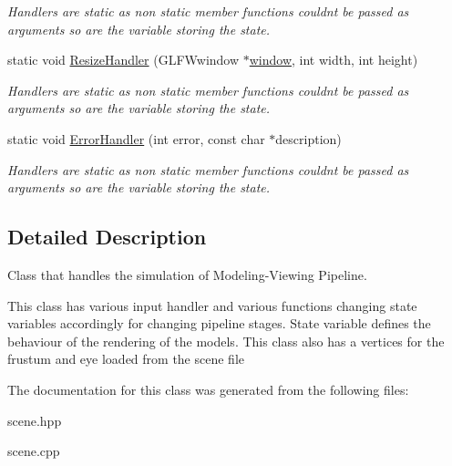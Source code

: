 \begin{DoxyCompactItemize}
\begin{DoxyCompactList}\small\item\em Handlers are static as non static member functions couldn\textquotesingle{}t be passed as arguments so are the variable storing the state. \end{DoxyCompactList}\item 
static void \hyperlink{classcft_1_1Scene_afd4f95d4aa28a930f464f282fdbeb6ac}{Resize\+Handler} (G\+L\+F\+Wwindow $\ast$\hyperlink{classcft_1_1Scene_a5743ac5a5872b962da380e6b8262a347}{window}, int width, int height)\hypertarget{classcft_1_1Scene_afd4f95d4aa28a930f464f282fdbeb6ac}{}\label{classcft_1_1Scene_afd4f95d4aa28a930f464f282fdbeb6ac}

\begin{DoxyCompactList}\small\item\em Handlers are static as non static member functions couldn\textquotesingle{}t be passed as arguments so are the variable storing the state. \end{DoxyCompactList}\item 
static void \hyperlink{classcft_1_1Scene_afa38a8f4811fee97004b9c4f07d12f19}{Error\+Handler} (int error, const char $\ast$description)\hypertarget{classcft_1_1Scene_afa38a8f4811fee97004b9c4f07d12f19}{}\label{classcft_1_1Scene_afa38a8f4811fee97004b9c4f07d12f19}

\begin{DoxyCompactList}\small\item\em Handlers are static as non static member functions couldn\textquotesingle{}t be passed as arguments so are the variable storing the state. \end{DoxyCompactList}\end{DoxyCompactItemize}


\subsection{Detailed Description}
Class that handles the simulation of Modeling-\/\+Viewing Pipeline. 

This class has various input handler and various functions changing state variables accordingly for changing pipeline stages. State variable defines the behaviour of the rendering of the models. This class also has a vertices for the frustum and eye loaded from the scene file 

The documentation for this class was generated from the following files\+:\begin{DoxyCompactItemize}
\item 
scene.\+hpp\item 
scene.\+cpp\end{DoxyCompactItemize}
